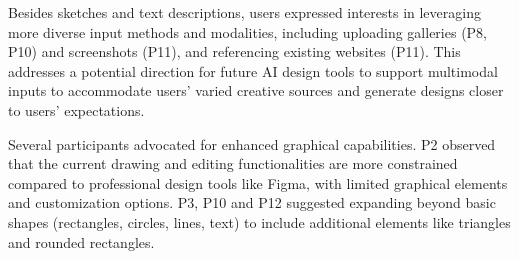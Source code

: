Besides sketches and text descriptions, users expressed interests in leveraging more diverse input methods and modalities, including uploading galleries (P8, P10) and screenshots (P11), and referencing existing websites (P11). This addresses a potential direction for future AI design tools to support multimodal inputs to accommodate users' varied creative sources and generate designs closer to users' expectations.

Several participants advocated for enhanced graphical capabilities. P2 observed that the current drawing and editing functionalities are more constrained compared to professional design tools like Figma, with limited graphical elements and customization options. P3, P10 and P12 suggested expanding beyond basic shapes (rectangles, circles, lines, text) to include additional elements like triangles and rounded rectangles.